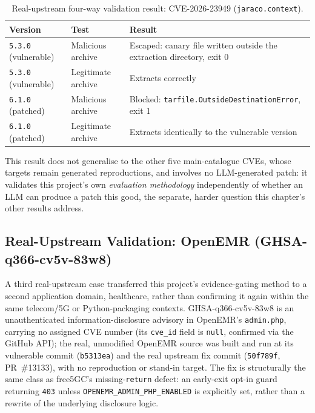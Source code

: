 \documentclass[12pt,a4paper]{report}
\begin{document}
\begin{table}[H]
\centering
\caption{Real-upstream four-way validation result: CVE-2026-23949 (\texttt{jaraco.context}).}
\label{tab:real-upstream}
\begin{tabular}{@{}p{2.6cm}p{3.4cm}p{7cm}@{}}
\toprule
\textbf{Version} & \textbf{Test} & \textbf{Result} \\
\midrule
\texttt{5.3.0} (vulnerable) & Malicious archive & Escaped: canary file written outside the extraction directory, exit 0 \\
\texttt{5.3.0} (vulnerable) & Legitimate archive & Extracts correctly \\
\texttt{6.1.0} (patched) & Malicious archive & Blocked: \texttt{tarfile.OutsideDestinationError}, exit 1 \\
\texttt{6.1.0} (patched) & Legitimate archive & Extracts identically to the vulnerable version \\
\bottomrule
\end{tabular}
\end{table}

This result does not generalise to the other five main-catalogue CVEs, whose targets remain generated reproductions, and involves no LLM-generated patch: it validates this project's own \emph{evaluation methodology} independently of whether an LLM can produce a patch this good, the separate, harder question this chapter's other results address.

\subsection{Real-Upstream Validation: OpenEMR (GHSA-q366-cv5v-83w8)}
\label{sec:openemr-validation}

A third real-upstream case transferred this project's evidence-gating method to a second application domain, healthcare, rather than confirming it again within the same telecom/5G or Python-packaging contexts. GHSA-q366-cv5v-83w8 is an unauthenticated information-disclosure advisory in OpenEMR's \texttt{admin.php}, carrying no assigned CVE number (its \texttt{cve\_id} field is \texttt{null}, confirmed via the GitHub API); the real, unmodified OpenEMR source was built and run at its vulnerable commit (\texttt{b5313ea}) and the real upstream fix commit (\texttt{50f789f}, PR~\#13133), with no reproduction or stand-in target. The fix is structurally the same class as free5GC's missing-\texttt{return} defect: an early-exit opt-in guard returning \texttt{403} unless \texttt{OPENEMR\_ADMIN\_PHP\_ENABLED} is explicitly set, rather than a rewrite of the underlying disclosure logic.
\end{document}
